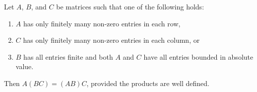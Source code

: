 Let $A$, $B$, and $C$ be matrices such that one of the following holds:
\begin{enumerate}
  \item $A$ has only finitely many non-zero entries in each row,
  \item $C$ has only finitely many non-zero entries in each column, or
  \item $B$ has all entries finite and both $A$ and $C$ have all entries bounded in absolute value.
\end{enumerate}
Then $A(BC) = (AB)C$, provided the products are well defined.

